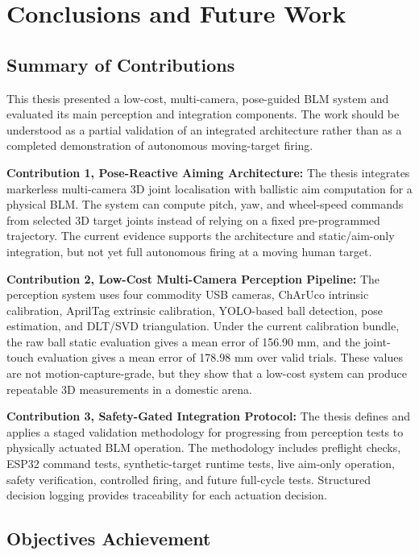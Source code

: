 \chapter{Conclusions and Future Work}

\section{Summary of Contributions}

This thesis presented a low-cost, multi-camera, pose-guided BLM system and evaluated its main perception and integration components. The work should be understood as a partial validation of an integrated architecture rather than as a completed demonstration of autonomous moving-target firing.

\textbf{Contribution 1, Pose-Reactive Aiming Architecture:} The thesis integrates markerless multi-camera 3D joint localisation with ballistic aim computation for a physical BLM. The system can compute pitch, yaw, and wheel-speed commands from selected 3D target joints instead of relying on a fixed pre-programmed trajectory. The current evidence supports the architecture and static/aim-only integration, but not yet full autonomous firing at a moving human target.

\textbf{Contribution 2, Low-Cost Multi-Camera Perception Pipeline:} The perception system uses four commodity USB cameras, ChArUco intrinsic calibration, AprilTag extrinsic calibration, YOLO-based ball detection, pose estimation, and DLT/SVD triangulation. Under the current calibration bundle, the raw ball static evaluation gives a mean error of 156.90 mm, and the joint-touch evaluation gives a mean error of 178.98 mm over valid trials. These values are not motion-capture-grade, but they show that a low-cost system can produce repeatable 3D measurements in a domestic arena.

\textbf{Contribution 3, Safety-Gated Integration Protocol:} The thesis defines and applies a staged validation methodology for progressing from perception tests to physically actuated BLM operation. The methodology includes preflight checks, ESP32 command tests, synthetic-target runtime tests, live aim-only operation, safety verification, controlled firing, and future full-cycle tests. Structured decision logging provides traceability for each actuation decision.

\section{Objectives Achievement}

